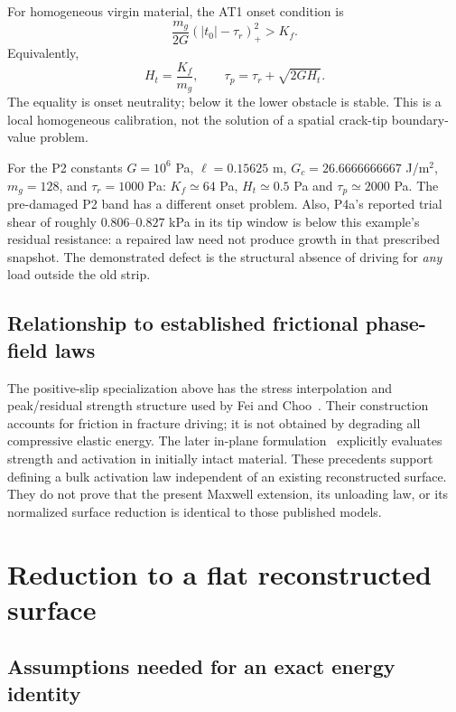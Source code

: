 \documentclass[11pt,a4paper]{article}
\numberwithin{equation}{section}
\begin{document}
For homogeneous virgin material, the AT1 onset condition is
\begin{equation}
 \frac{m_g}{2G}(|t_0|-\tau_r)_+^2>K_f.
 \label{eq:onset}
\end{equation}
Equivalently,
\begin{equation}
 H_t=\frac{K_f}{m_g},\qquad
 \boxed{\tau_p=\tau_r+\sqrt{2G H_t}.}
 \label{eq:strength}
\end{equation}
The equality is onset neutrality; below it the lower obstacle is stable.
This is a local homogeneous calibration, not the solution of a spatial
crack-tip boundary-value problem.

For the P2 constants $G=10^6$ Pa, $\ell=0.15625$ m,
$G_c=26.6666666667$ J/m$^2$, $m_g=128$, and $\tau_r=1000$ Pa:
$K_f\simeq64$ Pa, $H_t\simeq0.5$ Pa and $\tau_p\simeq2000$ Pa.
The pre-damaged P2 band has a different onset problem.
Also, P4a's reported trial shear of roughly $0.806$--$0.827$ kPa in its tip
window is below this example's residual resistance: a repaired law need not
produce growth in that prescribed snapshot. The demonstrated defect is the
structural absence of driving for \emph{any} load outside the old strip.

\subsection{Relationship to established frictional phase-field laws}

The positive-slip specialization above has the stress interpolation and
peak/residual strength structure used by Fei and Choo~\cite{fei2020}.
Their construction accounts for friction in fracture driving; it is not
obtained by degrading all compressive elastic energy.
The later in-plane formulation~\cite{fei2026} explicitly evaluates strength
and activation in initially intact material.
These precedents support defining a bulk activation law independent of an
existing reconstructed surface. They do not prove that the present Maxwell
extension, its unloading law, or its normalized surface reduction is identical
to those published models.

\section{Reduction to a flat reconstructed surface}
\label{sec:reduction}

\subsection{Assumptions needed for an exact energy identity}
\end{document}
